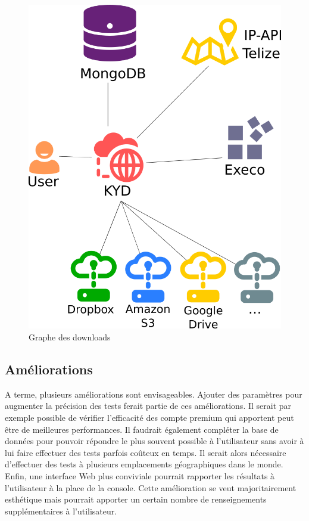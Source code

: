 \documentclass[10pt]{article}
\begin{document}
\begin{figure}[h]
\centering
\includegraphics[scale=0.3]{architecture.png}
\caption{Graphe des downloads}
\label{fig:Graphe des downloads}
\end{figure}

\subsection{Améliorations}

A terme, plusieurs améliorations sont envisageables. Ajouter des
paramètres pour augmenter la précision des tests ferait partie de ces
améliorations. Il serait par exemple possible de vérifier l'efficacité
des compte premium qui apportent peut être de meilleures
performances. Il faudrait également compléter la base de données pour
pouvoir répondre le plus souvent possible à l'utilisateur sans avoir à
lui faire effectuer des tests parfois coûteux en temps. Il serait
alors nécessaire d'effectuer des tests à plusieurs emplacements
géographiques dans le monde. Enfin, une interface Web plus conviviale
pourrait rapporter les résultats à l'utilisateur à la place de la
console. Cette amélioration se veut majoritairement esthétique mais
pourrait apporter un certain nombre de renseignements supplémentaires
à l'utilisateur.
\end{document}
